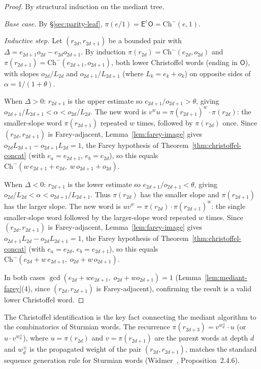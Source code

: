 \documentclass[12pt]{article}
\theoremstyle{definition}
\theoremstyle{remark}
\theoremstyle{plain}
\newcommand{\OO}{\mathsf{O}}
\newcommand{\EE}{\mathsf{E}}
\begin{document}
\begin{proof}
By structural induction on the mediant tree.

\emph{Base case.} By §\ref{sec:parity-leaf}, $\pi(e/1) = \EE^e\OO = \mathrm{Ch}^-(e, 1)$.

\emph{Inductive step.}
Let $(r_{2d}, r_{2d+1})$ be a bounded pair with $\Delta = e_{2d+1} o_{2d} - e_{2d} o_{2d+1}$.
By induction $\pi(r_{2d}) = \mathrm{Ch}^-(e_{2d}, o_{2d})$ and $\pi(r_{2d+1}) = \mathrm{Ch}^-(e_{2d+1}, o_{2d+1})$,
both lower Christoffel words (ending in $\OO$), with slopes $o_{2d}/L_{2d}$ and $o_{2d+1}/L_{2d+1}$
(where $L_k = e_k + o_k$) on opposite sides of $\alpha = 1/(1+\theta)$.

When $\Delta > 0$: $r_{2d+1}$ is the upper estimate so $e_{2d+1}/o_{2d+1} > \theta$,
giving $o_{2d+1}/L_{2d+1} < \alpha < o_{2d}/L_{2d}$.
The new word is $v^w u = \pi(r_{2d+1})^w \cdot \pi(r_{2d})$: the smaller-slope word
$\pi(r_{2d+1})$ repeated $w$ times, followed by $\pi(r_{2d})$ once.
Since $(r_{2d}, r_{2d+1})$ is Farey-adjacent, Lemma~\ref{lem:farey-image} gives
$o_{2d} L_{2d+1} - o_{2d+1} L_{2d} = 1$, the Farey hypothesis of
Theorem~\ref{thm:christoffel-concat} (with $e_a = e_{2d+1}$, $e_b = e_{2d}$),
so this equals $\mathrm{Ch}^-(w\,e_{2d+1} + e_{2d},\; w\,o_{2d+1} + o_{2d})$.

When $\Delta < 0$: $r_{2d+1}$ is the lower estimate so $e_{2d+1}/o_{2d+1} < \theta$,
giving $o_{2d}/L_{2d} < \alpha < o_{2d+1}/L_{2d+1}$.
Thus $\pi(r_{2d})$ has the smaller slope and $\pi(r_{2d+1})$ has the larger slope.
The new word is $u v^w = \pi(r_{2d}) \cdot \pi(r_{2d+1})^w$: the single smaller-slope
word followed by the larger-slope word repeated $w$ times.
Since $(r_{2d}, r_{2d+1})$ is Farey-adjacent, Lemma~\ref{lem:farey-image} gives
$o_{2d+1} L_{2d} - o_{2d} L_{2d+1} = 1$, the Farey hypothesis of
Theorem~\ref{thm:christoffel-concat} (with $e_a = e_{2d}$, $e_b = e_{2d+1}$),
so this equals $\mathrm{Ch}^-(e_{2d} + w\,e_{2d+1},\; o_{2d} + w\,o_{2d+1})$.

In both cases $\gcd(e_{2d} + w e_{2d+1},\; o_{2d} + w o_{2d+1}) = 1$
(Lemma~\ref{lem:mediant-farey}(4), since $(r_{2d}, r_{2d+1})$ is Farey-adjacent),
confirming the result is a valid lower Christoffel word.
\end{proof}

The Christoffel identification is the key fact connecting the mediant algorithm
to the combinatorics of Sturmian words.
The recurrence $\pi(r_{2d+3}) = v^{w^\pm_d} \cdot u$ (or $u \cdot v^{w^\pm_d}$),
where $u = \pi(r_{2d})$ and $v = \pi(r_{2d+1})$ are the parent words at depth $d$
and $w^\pm_d$ is the propagated weight of the pair $(r_{2d}, r_{2d+1})$,
matches the standard sequence generation rule for Sturmian words
(Widmer~\cite{widmer2010}, Proposition~2.4.6).
\end{document}
